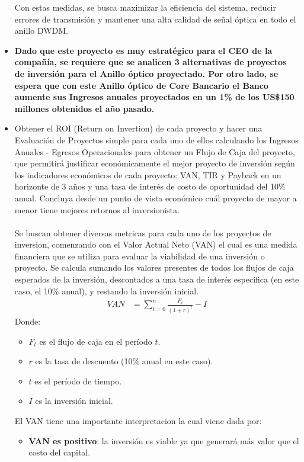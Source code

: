 \begin{itemize}
Con estas medidas, se busca maximizar la eficiencia del sistema, reducir errores de transmisión y mantener una alta calidad de señal óptica en todo el anillo DWDM.

	\item \textbf{Dado que este proyecto es muy estratégico para el CEO de la compañía, se requiere que se analicen 3 alternativas de proyectos de inversión para el Anillo óptico proyectado. Por otro lado, se espera que con este Anillo óptico de Core Bancario el Banco aumente sus Ingresos anuales proyectados en un 1\% de los US\$150 millones obtenidos el año pasado.}
	\item Obtener el ROI (Return on Invertion) de cada proyecto y hacer una Evaluación de Proyectos simple para cada uno de ellos calculando los Ingresos Anuales - Egresos Operacionales para obtener un
	Flujo de Caja del proyecto, que permitirá justificar económicamente el mejor proyecto de inversión según los indicadores económicos de cada proyecto: VAN, TIR y Payback en un horizonte de 3 años
	y una tasa de interés de costo de oportunidad del 10\% anual. Concluya desde un punto de vista económico cuál proyecto de mayor a menor tiene mejores retornos al inversionista.\\\\
	Se buscan obtener diversas metricas para cada uno de los proyectos de inversion, comenzando con el Valor Actual Neto (VAN) el cual es una medida financiera que se utiliza para evaluar la viabilidad de una inversión o proyecto. Se calcula sumando los valores presentes de todos los flujos de caja esperados de la inversión, descontados a una tasa de interés específica  (en este caso, el 10\% anual), y restando la inversión inicial.
	\begin{align}
		VAN &= \sum_{t=0}^{n} \frac{F_t}{(1+r)^t} - I
	\end{align}
	Donde:
	\begin{itemize}
    	\item $F_t$ es el flujo de caja en el período $t$.
    	\item $r$ es la tasa de descuento (10\% anual en este caso).
    	\item $t$ es el período de tiempo.
    	\item $I$ es la inversión inicial.
	\end{itemize}
	El VAN tiene una importante interpretacion la cual viene dada por:
	\begin{itemize}
    	\item \textbf{VAN es positivo}: la inversión es viable ya que generará más valor que el costo del capital.

\end{itemize}
\end{itemize}
